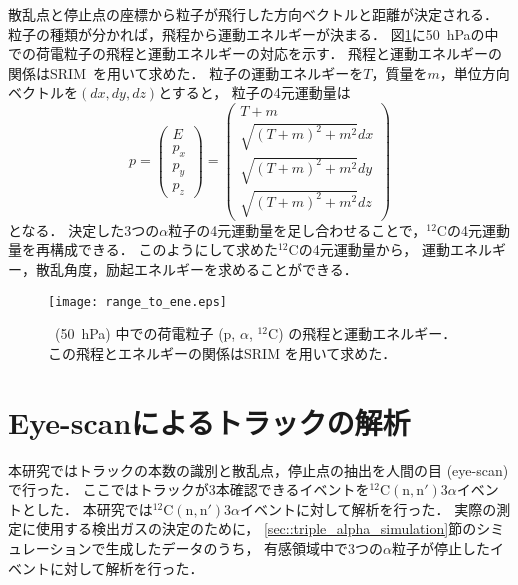 \documentclass[../master]{subfiles}
\begin{document}
散乱点と停止点の座標から粒子が飛行した方向ベクトルと距離が決定される．
粒子の種類が分かれば，飛程から運動エネルギーが決まる．
図\ref{fig::range_to_ene_alpha}に\SI{50}{\hecto\pascal}の\Methane 中での荷電粒子の飛程と運動エネルギーの対応を示す．
飛程と運動エネルギーの関係はSRIM~\cite{SRIM}を用いて求めた．
粒子の運動エネルギーを$T$，質量を$m$，単位方向ベクトルを$(dx, dy, dz)$とすると，
粒子の4元運動量は
\begin{equation}
  p =
  \begin{pmatrix}
    E \\ p_{x} \\ p_{y} \\ p_{z}
  \end{pmatrix}
  =
  \begin{pmatrix}
    T + m \\ \sqrt{(T+m)^2 + m^2} dx \\ \sqrt{(T+m)^2 + m^2} dy \\ \sqrt{(T+m)^2 + m^2} dz
  \end{pmatrix}
  \label{eq::momentum_vector}
\end{equation}
となる．
決定した3つの$\alpha$粒子の4元運動量を足し合わせることで，${}^{12}\mathrm{C}$の4元運動量を再構成できる．
このようにして求めた${}^{12}\mathrm{C}$の4元運動量から，
運動エネルギー，散乱角度，励起エネルギーを求めることができる．
\begin{figure}
  \centering
  \texttt{[image: range\_to\_ene.eps]}
  \caption[\Methane\ (\SI{50}{\hecto\pascal}) 中での荷電粒子 (p, $\alpha$, ${}^{12}\mathrm{C}$) の飛程と運動エネルギー．]
          {\Methane\ (\SI{50}{\hecto\pascal}) 中での荷電粒子 (p, $\alpha$, ${}^{12}\mathrm{C}$) の飛程と運動エネルギー．
            この飛程とエネルギーの関係はSRIM を用いて求めた．
          }
  \label{fig::range_to_ene_alpha}
\end{figure}


\section{Eye-scanによるトラックの解析}
本研究ではトラックの本数の識別と散乱点，停止点の抽出を人間の目 (eye-scan) で行った．
ここではトラックが3本確認できるイベントを${}^{12}\mathrm{C}(\mathrm{n},\mathrm{n}')3\alpha$イベントとした．
本研究では${}^{12}\mathrm{C}(\mathrm{n},\mathrm{n}')3\alpha$イベントに対して解析を行った．
実際の測定に使用する検出ガスの決定のために，
\ref{sec::triple_alpha_simulation}節のシミュレーションで生成したデータのうち，
有感領域中で3つの$\alpha$粒子が停止したイベントに対して解析を行った．
\end{document}
